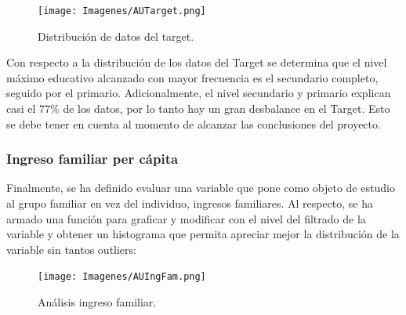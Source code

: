 \documentclass[a4paper]{article}
\begin{document}
            \begin{figure}[H]
                \centering
                \texttt{[image: Imagenes/AUTarget.png]} 
                \caption{Distribución de datos del target.}
                \label{AU Target}
            \end{figure}
           
            Con respecto a la distribución de los datos del Target se determina que el nivel máximo educativo alcanzado con mayor frecuencia es el secundario completo, seguido por el primario. Adicionalmente, el nivel secundario y primario explican casi el 77\% de los datos, por lo tanto hay un gran desbalance en el Target. Esto se debe tener en cuenta al momento de alcanzar las conclusiones del proyecto.
           
           \subsubsection{Ingreso familiar per cápita}
           
            Finalmente, se ha definido evaluar una variable que pone como objeto de estudio al grupo familiar en vez del individuo, ingresos familiares. Al respecto, se ha armado una función para graficar y modificar con el nivel del filtrado de la variable y obtener un histograma que permita apreciar mejor la distribución de la variable sin tantos outliers:
           
            \begin{figure}[H]
                \centering
                \texttt{[image: Imagenes/AUIngFam.png]}
                \caption{Análisis ingreso familiar.}
                \label{AU Family income}
            \end{figure}
           
           
 

           
           
\end{document}
